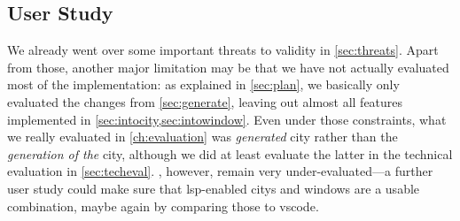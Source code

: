 \documentclass[../thesis]{subfiles}
\begin{document}
\subsection{User Study}
We already went over some important threats to validity in \cref{sec:threats}.
Apart from those, another major limitation may be that we have not actually evaluated most of the implementation: as explained in \cref{sec:plan}, we basically only evaluated the changes from \cref{sec:generate}, leaving out almost all features implemented in \cref{sec:intocity,sec:intowindow}.
Even under those constraints, what we really evaluated in \cref{ch:evaluation} was \emph{generated} \gls{city} rather than the \emph{generation of the} \gls{city}, although we did at least evaluate the latter in the technical evaluation in \cref{sec:techeval}.
, however, remain very under-evaluated---a further user study could make sure that \gls{lsp}-enabled \glspl{city} and \glspl{window} are a usable combination, maybe again by comparing those to \gls{vscode}.
\end{document}
